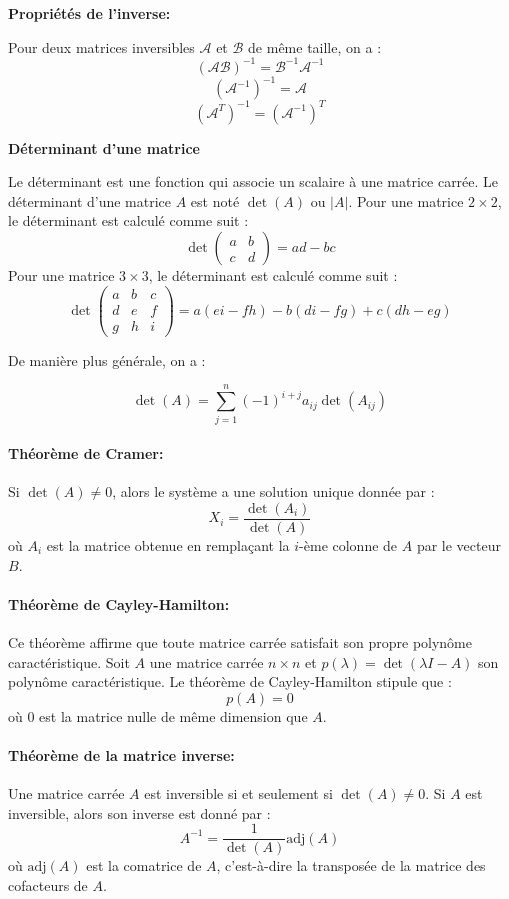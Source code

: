 \textbf{Propriétés de l'inverse:}

Pour deux matrices inversibles $\mathcal{A}$ et $\mathcal{B}$ de même taille, on a :
\[
(\mathcal{A} \mathcal{B})^{-1} = \mathcal{B}^{-1} \mathcal{A}^{-1}
\]
\[
(\mathcal{A}^{-1})^{-1} = \mathcal{A}
\]
\[
(\mathcal{A}^T)^{-1} = (\mathcal{A}^{-1})^T
\]

\textbf{Déterminant d'une matrice}

Le déterminant est une fonction qui associe un scalaire à une matrice carrée. Le déterminant d'une matrice \(A\) est noté \(\det(A)\) ou \(|A|\). Pour une matrice \(2 \times 2\), le déterminant est calculé comme suit :
\[
\det\begin{pmatrix}
a & b \\
c & d
\end{pmatrix} = ad - bc
\]
Pour une matrice \(3 \times 3\), le déterminant est calculé comme suit :
\[
\det\begin{pmatrix}
a & b & c \\
d & e & f \\
g & h & i
\end{pmatrix} = a(ei - fh) - b(di - fg) + c(dh - eg)
\]

De manière plus générale, on a :


\[
\det(A) = \sum_{j=1}^{n} (-1)^{i+j} a_{ij} \det(A_{ij})
\]


\paragraph{Théorème de Cramer:}
Si \(\det(A) \neq 0\), alors le système a une solution unique donnée par :
\[
X_i = \frac{\det(A_i)}{\det(A)}
\]
où \(A_i\) est la matrice obtenue en remplaçant la \(i\)-ème colonne de \(A\) par le vecteur \(B\).

\paragraph{Théorème de Cayley-Hamilton:}
Ce théorème affirme que toute matrice carrée satisfait son propre polynôme caractéristique. Soit \(A\) une matrice carrée \(n \times n\) et \(p(\lambda) = \det(\lambda I - A)\) son polynôme caractéristique. Le théorème de Cayley-Hamilton stipule que :
\[
p(A) = 0
\]
où \(0\) est la matrice nulle de même dimension que \(A\).

\paragraph{Théorème de la matrice inverse:}
Une matrice carrée \(A\) est inversible si et seulement si \(\det(A) \neq 0\). Si \(A\) est inversible, alors son inverse est donné par :
\[
A^{-1} = \frac{1}{\det(A)} \text{adj}(A)
\]
où \(\text{adj}(A)\) est la comatrice de \(A\), c'est-à-dire la transposée de la matrice des cofacteurs de \(A\).


